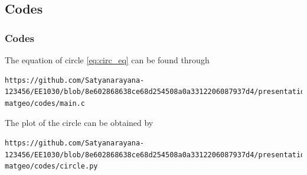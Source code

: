 \documentclass{beamer}
\theoremstyle{remark}
\numberwithin{equation}{section}
\begin{document}
\subsection{Codes}
\begin{frame}[fragile]
    \frametitle{Codes}
    The equation of circle \eqref{eq:circ_eq} can be found through
    {\footnotesize
\begin{lstlisting}
https://github.com/Satyanarayana-123456/EE1030/blob/8e602868638ce68d254508a0a3312206087937d4/presentation-matgeo/codes/main.c
\end{lstlisting}
}
    The plot of the circle can be obtained by{\footnotesize
\begin{lstlisting}
https://github.com/Satyanarayana-123456/EE1030/blob/8e602868638ce68d254508a0a3312206087937d4/presentation-matgeo/codes/circle.py
\end{lstlisting}
}
    \end{frame}
\end{document}
